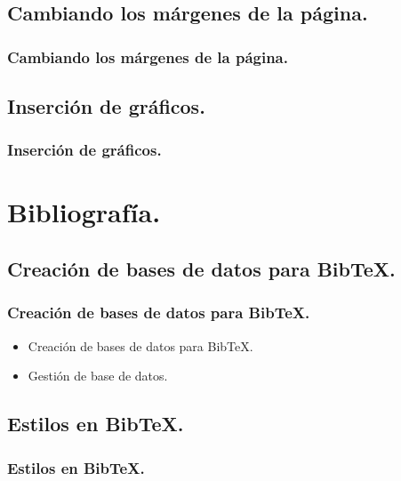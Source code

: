 \documentclass{beamer}
\begin{document}
\subsection{Cambiando los márgenes de la página.}
\begin{frame}
  \frametitle{Cambiando los márgenes de la página.}
\end{frame}

\subsection{Inserción de gráficos.}
\begin{frame}
  \frametitle{Inserción de gráficos.}
\end{frame}

\section{Bibliografía.}

\subsection{Creación de bases de datos para BibTeX.}
\begin{frame}
  \frametitle{Creación de bases de datos para BibTeX.}
   \begin{itemize}
   \item<1->{Creación de bases de datos para BibTeX.}
   \item<2->{Gestión de base de datos.}
  \end{itemize}
\end{frame}

\subsection{Estilos en BibTeX.}
\begin{frame}
  \frametitle{Estilos en BibTeX.}
\end{frame}
\end{document}
